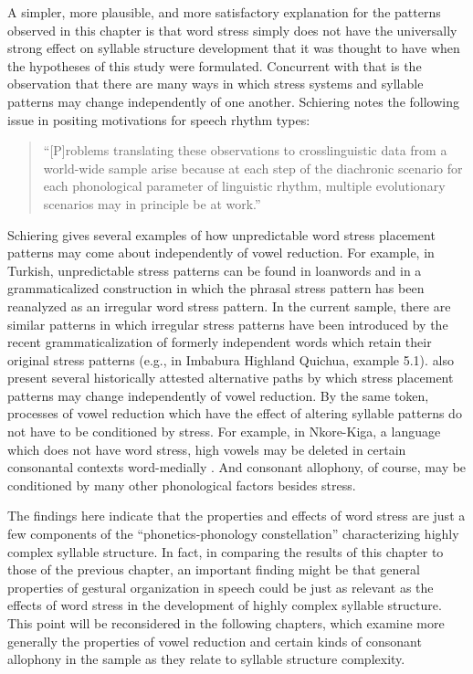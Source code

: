   A simpler, more plausible, and more satisfactory explanation for the patterns observed in this chapter is that word stress simply does not have the universally strong effect on syllable structure development that it was thought to have when the hypotheses of this study were formulated. Concurrent with that is the observation that there are many ways in which stress systems and syllable patterns may change independently of one another. Schiering notes the following issue in positing motivations for speech rhythm types:

\begin{quote}
“[P]roblems translating these observations to crosslinguistic data from a world-wide sample arise because at each step of the diachronic scenario for each phonological parameter of linguistic rhythm, multiple evolutionary scenarios may in principle be at work.” 
\citep[353]{Schiering2007}
\end{quote}

  Schiering gives several examples of how unpredictable word stress placement patterns may come about independently of vowel reduction. For example, in Turkish, unpredictable stress patterns can be found in loanwords and in a grammaticalized construction in which the phrasal stress pattern has been reanalyzed as an irregular word stress pattern. In the current sample, there are similar patterns in which irregular stress patterns have been introduced by the recent grammaticalization of formerly independent words which retain their original stress patterns (e.g., in Imbabura Highland Quichua, example 5.1). \citet{BybeeEtAl1998} also present several historically attested alternative paths by which stress placement patterns may change independently of vowel reduction. By the same token, processes of vowel reduction which have the effect of altering syllable patterns do not have to be conditioned by stress. For example, in Nkore-Kiga, a language which does not have word stress, high vowels may be deleted in certain consonantal contexts word-medially \citep[202-5]{Taylor1985}. And consonant allophony, of course, may be conditioned by many other phonological factors besides stress.

  The findings here indicate that the properties and effects of word stress are just a few components of the “phonetics-phonology constellation” \citep[354]{Schiering2007} characterizing highly complex syllable structure. In fact, in comparing the results of this chapter to those of the previous chapter, an important finding might be that general properties of gestural organization in speech could be just as relevant as the effects of word stress in the development of highly complex syllable structure. This point will be reconsidered in the following chapters, which examine more generally the properties of vowel reduction and certain kinds of consonant allophony in the sample as they relate to syllable structure complexity.

